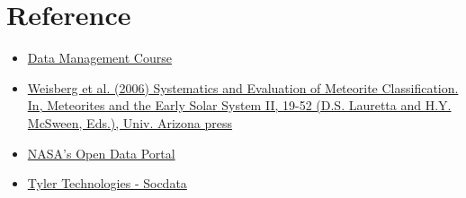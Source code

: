 \documentclass[conference]{IEEEtran}
\begin{document}
	\section{Reference}
	\begin{itemize}
		\item \href{https://www.diag.uniroma1.it/~lenzerin/index.html/?q=node/53}{Data Management Course}
		\item \href{https://web.pdx.edu/~ruzickaa/meteorites/papers/WeisbergEtal2006-classification.pdf}{Weisberg et al. (2006) Systematics and Evaluation of Meteorite Classification. In, Meteorites and the Early Solar System II, 19-52 (D.S. Lauretta and H.Y. McSween, Eds.), Univ. Arizona press}
		\item \href{https://data.nasa.gov/Space-Science/Meteorite-Landings/gh4g-9sfh/about_data}{NASA's Open Data Portal}
		\item \href{https://dev.socrata.com/docs/datatypes/location.html#}{Tyler Technologies - Socdata}
	\end{itemize}
	
	
	
	
	
\end{document}

